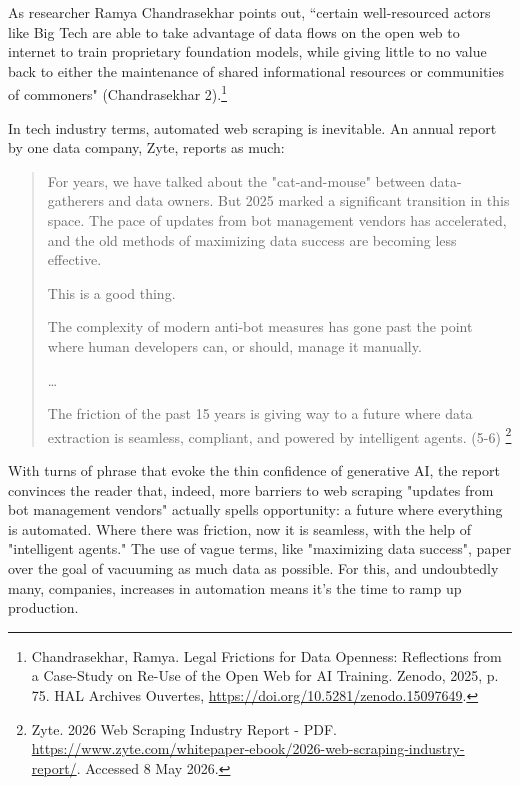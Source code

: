 \documentclass[11pt]{article}
\begin{document}
\begin{enumerate}
As researcher Ramya Chandrasekhar points out, “certain well-resourced
actors like Big Tech are able to take advantage of data flows on the
open web to internet to train proprietary foundation models, while
giving little to no value back to either the maintenance of shared
informational resources or communities of commoners" (Chandrasekhar
2).\footnote{Chandrasekhar, Ramya. Legal Frictions for Data Openness:
Reflections from a Case-Study on Re-Use of the Open Web for AI
Training. Zenodo, 2025, p. 75. HAL Archives Ouvertes,
\url{https://doi.org/10.5281/zenodo.15097649}.}

In tech industry terms, automated web scraping is inevitable. An
annual report by one data company, Zyte, reports as much:
\begin{quote}
For years, we have talked about the "cat-and-mouse" between data-
gatherers and data owners. But 2025 marked a significant transition in
this space. The pace of updates from bot management vendors has
accelerated, and the old methods of maximizing data success are
becoming less effective.

This is a good thing.

The complexity of modern anti-bot measures has gone past the point
where human developers can, or should, manage it manually.

\ldots{}

The friction of the past 15 years is giving way to a future where data
extraction is seamless, compliant, and powered by intelligent agents.
(5-6) \footnote{Zyte. 2026 Web Scraping Industry Report - PDF.
\url{https://www.zyte.com/whitepaper-ebook/2026-web-scraping-industry-report/}.
Accessed 8 May 2026.}
\end{quote}
With turns of phrase that evoke the thin confidence of generative AI,
the report convinces the reader that, indeed, more barriers to web
scraping "updates from bot management vendors" actually spells
opportunity: a future where everything is automated. Where there was
friction, now it is seamless, with the help of "intelligent agents."
The use of vague terms, like "maximizing data success", paper over the
goal of vacuuming as much data as possible. For this, and undoubtedly
many, companies, increases in automation means it's the time to ramp
up production.


\end{enumerate}
\end{document}
